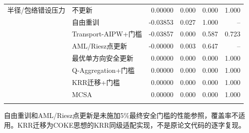 \begin{table}[ht]
\begin{tabular}{llrrrr}
\addlinespace
半径/包络错设压力 & 不更新 & 0.00000 & 0.000 & 0.000 & 1.000\\
 & 自由重训 & -0.03853 & 0.027 & 1.000 & --\\
 & Transport-AIPW+门槛 & -0.03857 & 0.000 & 0.587 & 0.723\\
 & AML/Riesz点更新 & -0.00000 & 0.003 & 0.647 & --\\
 & 最优单方向安全更新 & 0.00000 & 0.000 & 0.000 & 1.000\\
 & Q-Aggregation+门槛 & 0.00000 & 0.000 & 0.000 & 1.000\\
 & KRR迁移+门槛 & 0.00000 & 0.000 & 0.000 & 1.000\\
 & MCSA & 0.00000 & 0.000 & 0.000 & 1.000\\
\addlinespace
\bottomrule
\end{tabular}
\begin{minipage}{0.96\textwidth}\footnotesize 自由重训和AML/Riesz点更新是未施加5\%最终安全门槛的性能参照，覆盖率不适用。KRR迁移为COKE思想的KRR同级适配实现，不是原论文代码的逐字复现。\end{minipage}
\end{table}